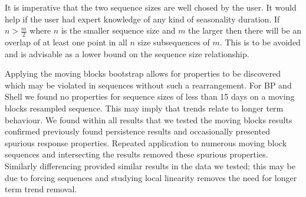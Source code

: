It is imperative that the two sequence sizes are well chosed by the
user. It would help if the user had expert knowledge of any kind of
seasonality duration. If $n > \frac{m}{2}$ where $n$ is the
smaller sequence size and $m$ the larger then there will be an overlap
of at least one point in all $n$ size subsequences of $m$. This is to
be avoided and is advisable as a lower bound on the sequence size
relationship. 

\medskip

Applying the moving blocks bootstrap allows for properties to be
discovered which may be violated in sequences without such a
rearrangement. For BP and Shell we found no properties for sequence
sizes of less than 15 days on a moving blocks resampled sequence. This
may imply that trends relate to longer term behaviour.
We
found within all results that we tested the moving blocks results
confirmed previously found persistence results and occasionally
presented spurious response properties. Repeated application to
numerous moving block sequences and intersecting the results removed
these spurious properties. Similarly differencing provided similar
results in the data we tested; this may be due to forcing sequences
and studying local linearity removes the need for longer term trend
removal.


